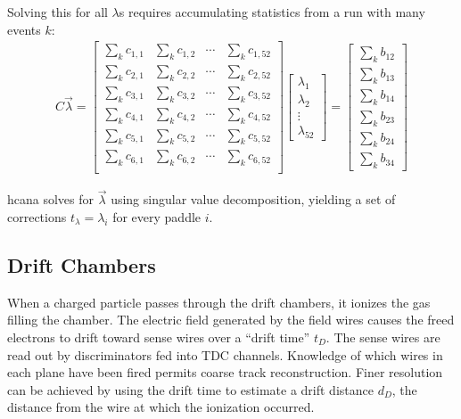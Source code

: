 \begin{itemize}
Solving this for all $\lambda$s requires accumulating statistics from a run with
many events $k$:
\begin{gather}
    C\vec{\lambda}
    =
    \begin{bmatrix}
        \sum_k c_{1,1} & \sum_k c_{1,2} & \cdots & \sum_k c_{1,52} \\
        \sum_k c_{2,1} & \sum_k c_{2,2} & \cdots & \sum_k c_{2,52} \\
        \sum_k c_{3,1} & \sum_k c_{3,2} & \cdots & \sum_k c_{3,52} \\
        \sum_k c_{4,1} & \sum_k c_{4,2} & \cdots & \sum_k c_{4,52} \\
        \sum_k c_{5,1} & \sum_k c_{5,2} & \cdots & \sum_k c_{5,52} \\
        \sum_k c_{6,1} & \sum_k c_{6,2} & \cdots & \sum_k c_{6,52} \\
    \end{bmatrix}
    \left[ \begin{array}{c} \lambda_1 \\ \lambda_2 \\ \vdots \\ \lambda_{52} \end{array} \right]
    =
    \left[ \begin{array}{c}  \sum_k b_{12} \\  \sum_k b_{13} \\  \sum_k b_{14} \\  \sum_k b_{23} \\  \sum_k b_{24} \\  \sum_k b_{34}  \end{array} \right]
\end{gather}

hcana solves for $\vec{\lambda}$ using singular value
decomposition, yielding a set of corrections $t_\lambda = \lambda_i$ for every
paddle $i$.


\end{itemize}

\subsection{Drift Chambers} \label{sec:dc_calib}
When a charged particle passes through the drift chambers, it ionizes the gas
filling the chamber.
The electric field generated by the field wires causes the freed electrons to
drift toward sense wires over a ``drift time'' $t_D$.
The sense wires are read out by discriminators fed into TDC channels.
Knowledge of which wires in each plane have been fired permits coarse track
reconstruction.
Finer resolution can be achieved by using the drift time to estimate a drift
distance $d_D$, the distance from the wire at which the ionization occurred.


